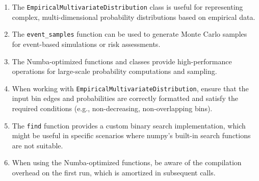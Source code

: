 \documentclass{article}
\begin{document}
\begin{enumerate}
    \item The \texttt{EmpiricalMultivariateDistribution} class is useful for representing complex, multi-dimensional probability distributions based on empirical data.

    \item The \texttt{event\_samples} function can be used to generate Monte Carlo samples for event-based simulations or risk assessments.

    \item The Numba-optimized functions and classes provide high-performance operations for large-scale probability computations and sampling.

    \item When working with \texttt{EmpiricalMultivariateDistribution}, ensure that the input bin edges and probabilities are correctly formatted and satisfy the required conditions (e.g., non-decreasing, non-overlapping bins).

    \item The \texttt{find} function provides a custom binary search implementation, which might be useful in specific scenarios where numpy's built-in search functions are not suitable.

    \item When using the Numba-optimized functions, be aware of the compilation overhead on the first run, which is amortized in subsequent calls.
\end{enumerate}
\end{document}
